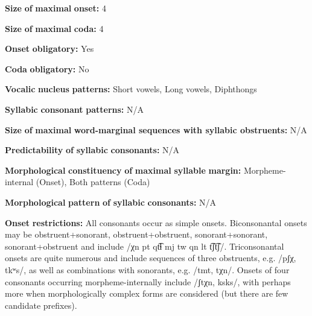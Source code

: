 \documentclass[output=paper]{langsci/langscibook}
\begin{document}
\begin{styleBody}
\textbf{Size} \textbf{of} \textbf{maximal} \textbf{onset:} 4
\end{styleBody}

\begin{styleBody}
\textbf{Size} \textbf{of} \textbf{maximal} \textbf{coda:} 4
\end{styleBody}

\begin{styleBody}
\textbf{Onset} \textbf{obligatory:} Yes
\end{styleBody}

\begin{styleBody}
\textbf{Coda} \textbf{obligatory:} No
\end{styleBody}

\begin{styleBody}
\textbf{Vocalic} \textbf{nucleus} \textbf{patterns:} Short vowels, Long vowels, Diphthongs
\end{styleBody}

\begin{styleBody}
\textbf{Syllabic} \textbf{consonant} \textbf{patterns:} N/A
\end{styleBody}

\begin{styleBody}
\textbf{Size} \textbf{of} \textbf{maximal} \textbf{word{}-marginal sequences with syllabic obstruents:} N/A
\end{styleBody}

\begin{styleBody}
\textbf{Predictability} \textbf{of} \textbf{syllabic} \textbf{consonants:} N/A
\end{styleBody}

\begin{styleBody}
\textbf{Morphological} \textbf{constituency} \textbf{of} \textbf{maximal} \textbf{syllable} \textbf{margin:} Morpheme-internal (Onset), Both patterns (Coda)
\end{styleBody}

\begin{styleBody}
\textbf{Morphological} \textbf{pattern} \textbf{of} \textbf{syllabic} \textbf{consonants:} N/A
\end{styleBody}

\begin{styleBody}
\textbf{Onset} \textbf{restrictions:} All consonants occur as simple onsets. Biconsonantal onsets may be obstruent+sonorant, obstruent+obstruent, sonorant+sonorant, sonorant+obstruent and include /χn pt qt͡ɬ mj tw qn lt t͡ʃt͡ʃ/. Triconsonantal onsets are quite numerous and include sequences of three obstruents, e.g. /pʃχ, tkʷs/, as well as combinations with sonorants, e.g. /tmt, tχn/. Onsets of four consonants occurring morpheme-internally include /ʃtχn, ksks/, with perhaps more when morphologically complex forms are considered (but there are few candidate prefixes).
\end{styleBody}
\end{document}
